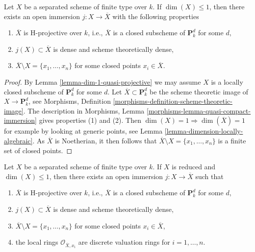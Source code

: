 \begin{lemma}
\label{lemma-dim-1-projective-completion}
Let $X$ be a separated scheme of finite type over $k$.
If $\dim(X) \leq 1$, then there exists an open immersion
$j : X \to \overline{X}$ with the following properties
\begin{enumerate}
\item $\overline{X}$ is H-projective over $k$, i.e., $\overline{X}$
is a closed subscheme of $\mathbf{P}^d_k$ for some $d$,
\item $j(X) \subset \overline{X}$ is dense and scheme
theoretically dense,
\item $\overline{X} \setminus X = \{x_1, \ldots, x_n\}$
for some closed points $x_i \in \overline{X}$.
\end{enumerate}
\end{lemma}

\begin{proof}
By Lemma \ref{lemma-dim-1-quasi-projective} we may assume $X$ is a
locally closed subscheme of $\mathbf{P}^d_k$ for some $d$. Let
$\overline{X} \subset \mathbf{P}^d_k$ be the scheme theoretic image
of $X \to \mathbf{P}^d_k$, see Morphisms, Definition
\ref{morphisms-definition-scheme-theoretic-image}.
The description in
Morphisms, Lemma \ref{morphisms-lemma-quasi-compact-immersion}
gives properties (1) and (2).
Then $\dim(X) = 1 \Rightarrow \dim(\overline{X}) = 1$ for example by
looking at generic points, see
Lemma \ref{lemma-dimension-locally-algebraic}.
As $\overline{X}$ is Noetherian, it then
follows that $\overline{X} \setminus X = \{x_1, \ldots, x_n\}$
is a finite set of closed points.
\end{proof}

\begin{lemma}
\label{lemma-reduced-dim-1-projective-completion}
Let $X$ be a separated scheme of finite type over $k$.
If $X$ is reduced and $\dim(X) \leq 1$, then there exists
an open immersion $j : X \to \overline{X}$ such that
\begin{enumerate}
\item $\overline{X}$ is H-projective over $k$, i.e., $\overline{X}$
is a closed subscheme of $\mathbf{P}^d_k$ for some $d$,
\item $j(X) \subset \overline{X}$ is dense and scheme
theoretically dense,
\item $\overline{X} \setminus X = \{x_1, \ldots, x_n\}$
for some closed points $x_i \in \overline{X}$,
\item the local rings $\mathcal{O}_{\overline{X}, x_i}$
are discrete valuation rings for $i = 1, \ldots, n$.
\end{enumerate}
\end{lemma}

